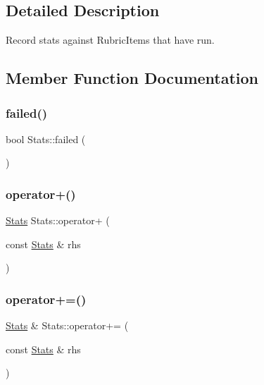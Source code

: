 \subsection{Detailed Description}
Record stats against Rubric\+Items that have run. 

\subsection{Member Function Documentation}
\hypertarget{class_stats_afa92b4d8fa48ee7cd6e349ae6a5bf539}{}\label{class_stats_afa92b4d8fa48ee7cd6e349ae6a5bf539} 
\subsubsection{\texorpdfstring{failed()}{failed()}}
{\footnotesize\ttfamily bool Stats\+::failed (\begin{DoxyParamCaption}{ }\end{DoxyParamCaption})}

\hypertarget{class_stats_a32ab6b479ad79fe923e2264e09080806}{}\label{class_stats_a32ab6b479ad79fe923e2264e09080806} 
\subsubsection{\texorpdfstring{operator+()}{operator+()}}
{\footnotesize\ttfamily \hyperlink{class_stats}{Stats} Stats\+::operator+ (\begin{DoxyParamCaption}\item[{const \hyperlink{class_stats}{Stats} \&}]{rhs }\end{DoxyParamCaption})}

\hypertarget{class_stats_a40fa54dfb9b36d73bd77c5db4b294a79}{}\label{class_stats_a40fa54dfb9b36d73bd77c5db4b294a79} 
\subsubsection{\texorpdfstring{operator+=()}{operator+=()}}
{\footnotesize\ttfamily \hyperlink{class_stats}{Stats} \& Stats\+::operator+= (\begin{DoxyParamCaption}\item[{const \hyperlink{class_stats}{Stats} \&}]{rhs }\end{DoxyParamCaption})}

